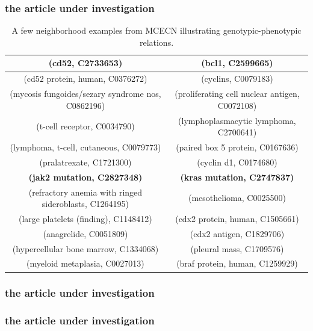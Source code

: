 \documentclass{beamer}
\newcommand\T{\rule{0pt}{2.6ex}}       %
\newcommand\B{\rule[-1.2ex]{0pt}{0pt}} %
\begin{document}
\begin{frame}
\frametitle{the article under investigation}
\begin{table}[t]
\caption{\centering \scriptsize
 A few neighborhood
  examples from MCECN illustrating genotypic-phenotypic relations.\label{table:genotype-examples}}
{ \tiny
\begin{center}
\begin{tabular}{|c|c|} 
\hline
 {\bf (cd52, C2733653)} &  {\bf (bcl1, C2599665)} \T \B \\ 
\hline
(cd52 protein, human, C0376272) &  (cyclins, C0079183) \T \\
(mycosis fungoides/sezary syndrome nos, C0862196) &   (proliferating cell nuclear antigen, C0072108) \T \\
(t-cell receptor, C0034790) &  (lymphoplasmacytic lymphoma, C2700641) \T \\
 (lymphoma, t-cell, cutaneous, C0079773) & (paired box 5 protein, C0167636) \T \\
 (pralatrexate, C1721300) &   (cyclin d1, C0174680) \T \\
\hline
{\bf (jak2 mutation, C2827348)} & {\bf (kras mutation, C2747837) }  \T \B \\
\hline
 (refractory anemia with ringed sideroblasts, C1264195) & (mesothelioma, C0025500) \T \\
(large platelets (finding), C1148412) &  (cdx2 protein, human, C1505661) \T \\
 (anagrelide, C0051809) &  (cdx2 antigen, C1829706) \T \\
 (hypercellular bone marrow, C1334068)  & (pleural mass, C1709576) \T \\
 (myeloid metaplasia, C0027013) & (braf protein, human, C1259929) \T \\
\hline
\end{tabular}
\end{center}
}
\end{table}
\end{frame}

\begin{frame}
\frametitle{the article under investigation}
\end{frame}

\begin{frame}
\frametitle{the article under investigation}
\end{frame}
\end{document}
